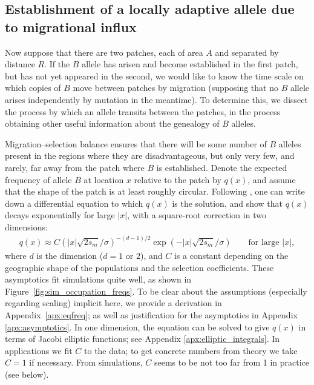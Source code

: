 \documentclass{article}
\begin{document}
\subsection{Establishment of a locally adaptive allele due to migrational influx}
\label{ss:patchymigration}

Now suppose that there are two patches, each of area $A$ and separated by distance $R$. 
If the $B$ allele has arisen and become established in the first patch, but has not yet appeared in the second,
we would like to know the time scale on which copies of $B$ move between patches by migration
(supposing that no $B$ allele arises independently by mutation in the meantime).
To determine this, we dissect the process by which an allele transits between the patches,
in the process obtaining other useful information about the genealogy of $B$ alleles.

Migration--selection balance ensures that 
there will be some number of $B$ alleles present in the regions where they are disadvantageous,
but only very few, and rarely, far away from the patch where $B$ is established.
Denote the expected frequency of allele $B$ at location $x$ relative to the patch by $q(x)$,
and assume that the shape of the patch is at least roughly circular.
Following \citet{slatkin1973geneflow}, one can write down a differential equation to which $q(x)$ is the solution,
and show that $q(x)$ decays exponentially for large $|x|$,
with a square-root correction in two dimensions:
\begin{align} \label{eqn:eqfreq}
  q(x) \approx C \left( |x| \sqrt{2 s_m}/\sigma \right)^{-(d-1)/2} \exp( - |x| \sqrt{2 s_m} / \sigma) \qquad \text{for large $|x|$},
\end{align}
where $d$ is the dimension ($d=1$ or $2$), 
and $C$ is a constant depending on the geographic shape of the populations and the selection coefficients.
These asymptotics fit simulations quite well, as shown in Figure~\ref{fig:sim_occupation_freqs}.
To be clear about the assumptions (especially regarding scaling) implicit here,
we provide a derivation in Appendix~\ref{apx:eqfreq}; 
as well as justification for the asymptotics in Appendix \ref{apx:asymptotics}.
In one dimension, the equation can be solved to give $q(x)$ 
in terms of Jacobi elliptic functions; see Appendix \ref{apx:elliptic_integrals}.
In applications we fit $C$ to the data;
to get concrete numbers from theory we take $C=1$ if necessary.
From simulations, $C$ seems to be not too far from 1 in practice (see below).
\end{document}
